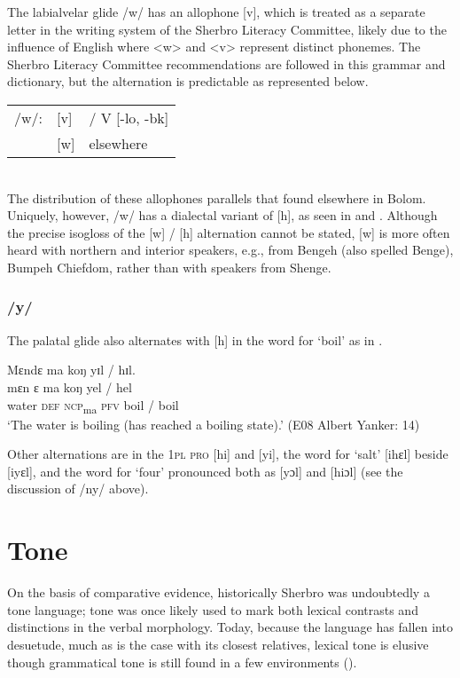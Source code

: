 The labialvelar glide /w/ has an allophone [v], which is treated as a separate letter in the writing system of the Sherbro Literacy Committee, likely due to the influence of English where <w> and <v> represent distinct phonemes. The Sherbro Literacy Committee recommendations are followed in this grammar and dictionary, but the alternation is predictable as represented below.\\

\begin{tabular}[t]{lll}
/w/: &  [v] &  / {\longrule} V [-lo, -bk]\\
 & [w] & elsewhere\\
\end{tabular}\\

The distribution of these allophones parallels that found elsewhere in Bolom. Uniquely, however, /w/ has a dialectal variant of [h], as seen in  and . Although the precise isogloss of the [w] / [h] alternation cannot be stated, [w] is more often heard with northern and interior speakers, e.g., from Bengeh (also spelled Benge), Bumpeh Chiefdom, rather than with speakers from Shenge.

\subsubsection{/y/}
\label{sec:2.1.2.9}
The palatal glide also alternates with [h] in the word for ‘boil' as in .

\ea%
\label{ex:29}
Mɛndɛ ma koŋ yɪl / hɪl.\\
\gll mɛn  ɛ    ma    koŋ   yel / hel\\
water  \textsc{def}  \textsc{ncp}\textsubscript{ma}    \textsc{pfv}  boil / boil\\
\glt ‘The water is boiling (has reached a boiling state).' (E08 Albert Yanker: 14)
\z

Other alternations are in the \textsc{1pl} \textsc{pro} [hi] and [yi], the word for ‘salt' [ihɛl] beside [iyɛl], and the word for ‘four' pronounced both as [yɔl] and [hiɔl] (see the discussion of /ny/ above).

\section{Tone}
\label{sec:2.2}\hypertarget{Toc115517756}{}
On the basis of comparative evidence, historically Sherbro was undoubtedly a tone language; tone was once likely used to mark both lexical contrasts and distinctions in the verbal morphology. Today, because the language has fallen into desuetude, much as is the case with its closest relatives, lexical tone is elusive though grammatical tone is still found in a few environments (\citealt{Childs2002a}).

